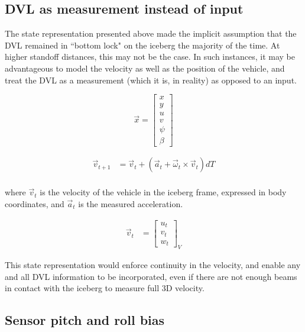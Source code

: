 \subsection{DVL as measurement instead of input}

The state representation presented above made the implicit assumption that the DVL remained in ``bottom lock" on the iceberg the majority of the time. At higher standoff distances, this may not be the case. In such instances, it may be advantageous to model the velocity as well as the position of the vehicle, and treat the DVL as a measurement (which it is, in reality) as opposed to an input.

\begin{equation}
\label{eq.altState}
\vec{x}= \left[\begin{array}{c}
                     x \\ y \\ u \\ v \\ \psi \\ \beta 
                     \end{array}\right]
\end{equation}

\begin{align}
\vec{v}_{t+1} &= \vec{v}_t + \left( \vec{a}_t + \vec{\omega}_t \times \vec{v}_t \right)dT\\
\end{align}

where $\vec{v}_t$ is the velocity of the vehicle in the iceberg frame, expressed in body coordinates, and $\vec{a}_t$ is the measured acceleration.
 
\begin{align}
\vec{v}_{t} &=  \left[\begin{array}{c}
                     u_t \\ v_t \\ w_t
                     \end{array}\right]_V
\end{align}

This state representation would enforce continuity in the velocity, and enable any and all DVL information to be incorporated, even if there are not enough beams in contact with the iceberg to measure full 3D velocity.

\subsection{Sensor pitch and roll bias}


